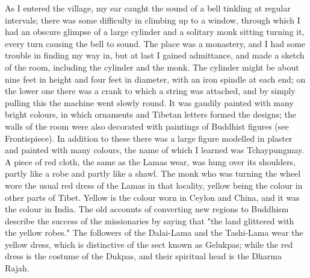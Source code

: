 \documentclass[a4paper, 11pt, oneside, polutonikogreek, english]{article}
\begin{document}
As I entered the village, my ear caught the sound of a bell tinkling at regular intervals; there was some difficulty in climbing up to a window, through which I had an obscure glimpse of a large cylinder and a solitary monk sitting turning it, every turn causing the bell to sound. The place was a monastery, and I had some trouble in finding my way in, but at last I gained admittance, and made a sketch of the room, including the cylinder and the monk. The cylinder might be about nine feet in height and four feet in diameter, with an iron spindle at each end; on the lower one there was a crank to which a string was attached, and by simply pulling this the machine went slowly round. It was gaudily painted with many bright colours, in which ornaments and Tibetan letters formed the designs; the walls of the room were also decorated with paintings of Buddhist figures (see Frontispiece). In addition to these there was a large figure modelled in plaster and painted with many colours, the name of which I learned was Tchaypungmay. A piece of red cloth, the same as the Lamas wear, was hung over its shoulders, partly like a robe and partly like a shawl. The monk who was turning the wheel wore the usual red dress of the Lamas in that locality, yellow being the colour in other parts of Tibet. Yellow is the colour worn in Ceylon and China, and it was the colour in India. The old accounts of converting new regions to Buddhism describe the success of the missionaries by saying that "the land glittered with the yellow robes." The followers of the Dalai-Lama and the Tashi-Lama wear the yellow dress, which is distinctive of the sect known as Gelukpas; while the red dress is the costume of the Dukpas, and their spiritual head is the Dharma Rajah.
\end{document}
